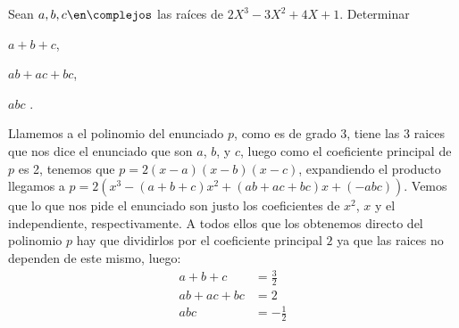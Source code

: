 \begin{enunciado}{\ejercicio}
  Sean $a, b, c \en \complejos$ las raíces de $2X^3 - 3X^2 + 4X + 1$. Determinar
  \begin{enumerate}[label=\roman*)]
    \begin{multicols}{3}
      \item $a + b + c$,
      \item $ab + ac + bc$,
      \item $abc$ .
    \end{multicols}
  \end{enumerate}
\end{enunciado}

Llamemos a el polinomio del enunciado $p$, como es de grado 3, tiene las 3 raices que nos dice
el enunciado que son $a$, $b$, y $c$, luego como el coeficiente principal de $p$ es 2, tenemos que 
$p = 2(x-a)(x-b)(x-c)$, expandiendo el producto llegamos a $p = 2(x^3-(a+b+c)x^2 + (ab+ac+bc)x + (-abc))$. 
Vemos que lo que nos pide el enunciado son justo los coeficientes de $x^2$, $x$ y el independiente, respectivamente. A
todos ellos que los obtenemos directo del polinomio $p$ hay que dividirlos por el coeficiente principal $2$ ya que las raices no dependen
de este mismo, luego:
\begin{align*}
  a + b + c &= \frac{3}{2}\\
  ab + ac + bc &= 2\\
  abc &= -\frac{1}{2}\\
\end{align*}

\begin{aportes}
  \item {}
\end{aportes}
